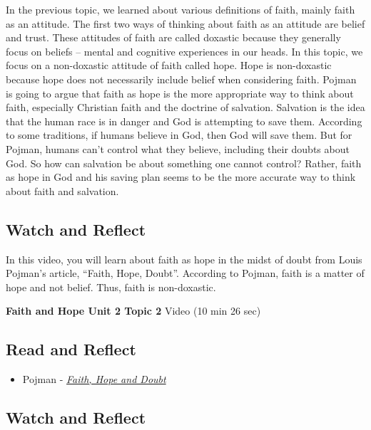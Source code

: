 \documentclass[
]{book}
\providecommand{\tightlist}{%
  \setlength{\itemsep}{0pt}\setlength{\parskip}{0pt}}
\begin{document}
In the previous topic, we learned about various definitions of faith, mainly faith as an attitude. The first two ways of thinking about faith as an attitude are belief and trust. These attitudes of faith are called doxastic because they generally focus on beliefs -- mental and cognitive experiences in our heads. In this topic, we focus on a non-doxastic attitude of faith called hope. Hope is non-doxastic because hope does not necessarily include belief when considering faith. Pojman is going to argue that faith as hope is the more appropriate way to think about faith, especially Christian faith and the doctrine of salvation. Salvation is the idea that the human race is in danger and God is attempting to save them. According to some traditions, if humans believe in God, then God will save them. But for Pojman, humans can't control what they believe, including their doubts about God. So how can salvation be about something one cannot control? Rather, faith as hope in God and his saving plan seems to be the more accurate way to think about faith and salvation.

\hypertarget{watch-and-reflect-11}{%
\subsection*{Watch and Reflect}\label{watch-and-reflect-11}}

In this video, you will learn about faith as hope in the midst of doubt from Louis Pojman's article, ``Faith, Hope, Doubt''. According to Pojman, faith is a matter of hope and not belief. Thus, faith is non-doxastic.

\textbf{Faith and Hope Unit 2 Topic 2} Video (10 min 26 sec)

\hypertarget{read-and-reflect-4}{%
\subsection*{Read and Reflect}\label{read-and-reflect-4}}

\begin{itemize}
\tightlist
\item
  Pojman - \href{assets/u2/PHIL-100-Pojman-Faith-Hope-and-Doubt.pdf}{\emph{Faith, Hope and Doubt}}
\end{itemize}

\hypertarget{watch-and-reflect-12}{%
\subsection*{Watch and Reflect}\label{watch-and-reflect-12}}
\end{document}
